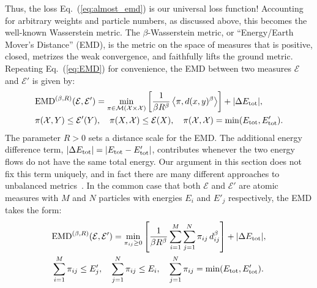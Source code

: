 \documentclass[letterpaper,11pt]{article}
\newcommand{\E}{\mathcal{E}}
\newcommand{\M}{\mathcal{M}}
\newcommand{\EMD}{\text{EMD}}
\DeclareRobustCommand{\Eq}[1]{Eq.~(\ref{eq:#1})}
\begin{document}
Thus, the loss \Eq{almost_emd} is our universal loss function! Accounting for arbitrary weights and particle numbers, as discussed above, this becomes the well-known Wasserstein metric. The $\beta$-Wasserstein metric, or ``Energy/Earth Mover's Distance'' (EMD), is the metric on the space of measures that is positive, closed, metrizes the weak convergence, and faithfully lifts the ground metric. Repeating \Eq{EMD} for convenience, the EMD between two measures $\E$ and $\E'$ is given by:
%
\begin{align} \label{eq:EMD_appendix}
    &\EMD^{(\beta,R)}(\E, \E') = \min_{\pi \in \M(\mathcal{X}\times\mathcal{X})}\left[\frac{1}{\beta R^\beta}\expval{\pi, d(x,y)^{\beta}}\right] + |\Delta E_{\rm tot}|, \nonumber \\
    &\pi(\mathcal{X}, Y) \leq \E'(Y) ,\quad \pi(X, \mathcal{X}) \leq \E(X), \quad \pi(\mathcal{X}, \mathcal{X}) = \min(E_{\rm tot}, E'_{\rm tot}).
\end{align}
%
 The parameter $R > 0$ sets a distance scale for the EMD. The additional energy difference term, $|\Delta E_{\rm tot}| = |E_{\rm tot} - E'_{\rm tot}|$, contributes whenever the two energy flows do not have the same total energy. Our argument in this section does not fix this term uniquely, and in fact there are many different approaches to unbalanced metrics~\cite{Piccoli_2013, Cai:2021hnn, Liero_2016}. 
%
In the common case that both $\E$ and $\E'$ are atomic measures with $M$ and $N$ particles with energies $E_i$ and $E'_j$ respectively, the EMD takes the form:
%
\begin{align} \label{eq:EMD_atomic_appendix}
    &\EMD^{(\beta,R)}(\E, \E') = \min_{\pi_{ij} \geq 0}\left[\frac{1}{\beta R^\beta}\sum_{i=1}^M\sum_{j=1}^N \pi_{ij} \, d_{ij}^\beta\right] + |\Delta E_{\rm tot}|, \nonumber \\
    &\sum_{i=1}^M \pi_{ij} \leq E'_j , \quad \sum_{j=1}^N \pi_{ij} \leq E_i, \quad \sum_{j=1}^N \pi_{ij} = \min(E_{\rm tot}, E'_{\rm tot}).
\end{align}
%






\end{document}
